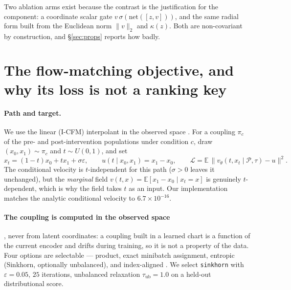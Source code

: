 \documentclass{article}
\newcommand{\Pset}{\mathcal{P}}
\begin{document}
Two ablation arms exist because the contrast is the justification for the component: a
coordinate scalar gate $v\,\sigma(\mathrm{net}([z,v]))$, and the same radial form built from
the Euclidean norm $\|v\|_{2}$ and $\kappa(z)$. Both are non-covariant by construction, and
\S\ref{sec:props} reports how badly.

\section{The flow-matching objective, and why its loss is not a ranking key}
\label{sec:cfm}

\paragraph{Path and target.} We use the linear (I-CFM) interpolant in the observed space
\citep{lipman2022fm,tong2023otcfm}. For a coupling $\pi_{c}$ of the pre- and
post-intervention populations under condition $c$, draw $(x_{0}, x_{1}) \sim \pi_{c}$ and
$t \sim U(0,1)$, and set
\begin{equation}
x_{t} = (1-t)x_{0} + t x_{1} + \sigma\varepsilon, \qquad
u(t \mid x_{0}, x_{1}) = x_{1} - x_{0}, \qquad
\mathcal{L} = \mathbb{E}\,\bigl\| v_{\theta}(t, x_{t} \mid \Pset, \tau) - u \bigr\|^{2}.
\label{eq:cfm}
\end{equation}
The conditional velocity is $t$-independent for this path ($\sigma > 0$ leaves it unchanged),
but the \emph{marginal} field $v(t,x) = \mathbb{E}[x_{1}-x_{0} \mid x_{t}=x]$ is genuinely
$t$-dependent, which is why the field takes $t$ as an input. Our implementation matches the
analytic conditional velocity to $6.7\times10^{-16}$.

\paragraph{The coupling is computed in the observed space}, never from latent coordinates: a
coupling built in a learned chart is a function of the current encoder and drifts during
training, so it is not a property of the data. Four options are selectable --- product,
exact minibatch assignment, entropic (Sinkhorn, optionally unbalanced), and index-aligned
\citep{tong2023otcfm}. We select \texttt{sinkhorn} with $\varepsilon = 0.05$, $25$
iterations, unbalanced relaxation $\tau_{\mathrm{ub}} = 1.0$ on a held-out distributional
score.
\end{document}
